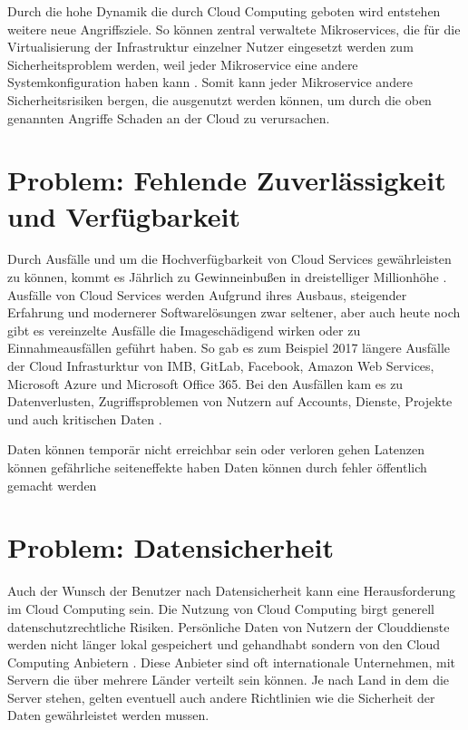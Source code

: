 Durch die hohe Dynamik die durch Cloud Computing geboten wird entstehen weitere neue Angriffsziele. So können zentral verwaltete Mikroservices, die für die Virtualisierung der Infrastruktur einzelner Nutzer eingesetzt werden zum Sicherheitsproblem werden, weil jeder Mikroservice eine andere Systemkonfiguration haben kann \cite{chen2019}. Somit kann jeder Mikroservice andere Sicherheitsrisiken bergen, die ausgenutzt werden können, um durch die oben genannten Angriffe Schaden an der Cloud zu verursachen. 

\section{Problem: Fehlende Zuverlässigkeit und Verfügbarkeit}
\label{sec:fehlende-Sicherheit}
Durch Ausfälle und um die Hochverfügbarkeit von Cloud Services gewährleisten zu können, 
kommt es Jährlich zu Gewinneinbußen in dreistelliger Millionhöhe \cite{snyder2015 }.
Ausfälle von Cloud Services werden Aufgrund ihres Ausbaus, 
steigender Erfahrung und modernerer Softwarelösungen zwar seltener, 
aber auch heute noch gibt es vereinzelte Ausfälle die Imageschädigend wirken oder zu Einnahmeausfällen geführt haben. 
So gab es zum Beispiel 2017 längere Ausfälle der Cloud Infrasturktur von 
IMB, GitLab, Facebook, Amazon Web Services, Microsoft Azure und Microsoft Office 365. 
Bei den Ausfällen kam es zu Datenverlusten, Zugriffsproblemen von Nutzern auf Accounts, 
Dienste, Projekte und auch kritischen Daten \cite{tsidulko}.


Daten können temporär nicht erreichbar sein oder verloren gehen
Latenzen können gefährliche seiteneffekte haben
Daten können durch fehler öffentlich gemacht werden

\section{Problem: Datensicherheit}
Auch der Wunsch der Benutzer nach Datensicherheit kann eine Herausforderung im Cloud Computing sein. Die Nutzung von Cloud Computing birgt generell datenschutzrechtliche Risiken. 
Persönliche Daten von Nutzern der Clouddienste werden nicht länger lokal gespeichert und gehandhabt sondern von den Cloud Computing Anbietern \cite{selzer2020}. 
Diese Anbieter sind oft internationale Unternehmen, mit Servern die über mehrere Länder verteilt sein können. Je nach Land in dem die Server stehen, gelten eventuell auch andere Richtlinien wie die Sicherheit der Daten gewährleistet werden mussen.




